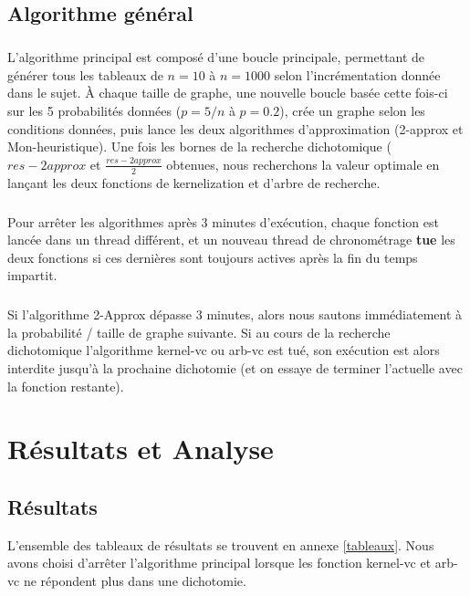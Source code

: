 \documentclass[a4paper,10pt,twoside]{report}
\begin{document}
    \section{Algorithme général}
    \paragraph{}L'algorithme principal est composé d'une boucle principale, permettant de générer tous les tableaux de $n=10$ à $n=1000$ selon l'incrémentation donnée dans le sujet.
  À chaque taille de graphe, une nouvelle boucle basée cette fois-ci sur les 5 probabilités données ($p=5/n$ à $p=0.2$), crée un graphe selon les conditions données, puis lance les deux algorithmes d'approximation (2-approx et Mon-heuristique). Une fois les bornes de la recherche dichotomique (\textbf{$res-2approx$} et \textbf{$\frac{res-2approx}{2}$} obtenues, nous recherchons la valeur optimale en lançant les deux fonctions de kernelization et d'arbre de recherche.
  
  \paragraph{}Pour arrêter les algorithmes après 3 minutes d'exécution, chaque fonction est lancée dans un thread différent, et un nouveau thread de chronométrage \textbf{tue} les deux fonctions si ces dernières sont toujours actives après la fin du temps impartit.
    
    \paragraph{} Si l'algorithme 2-Approx dépasse 3 minutes, alors nous sautons immédiatement à la probabilité / taille de graphe suivante. Si au cours de la recherche dichotomique l'algorithme kernel-vc ou arb-vc est tué, son exécution est alors interdite jusqu'à la prochaine dichotomie (et on essaye de terminer l'actuelle avec la fonction restante). 
    
    
\chapter{Résultats et Analyse}
    \section{Résultats}
    L'ensemble des tableaux de résultats se trouvent en annexe \ref{tableaux}. Nous avons choisi d’arrêter l'algorithme principal lorsque les fonction kernel-vc et arb-vc ne répondent plus dans une dichotomie.
    
\end{document}
